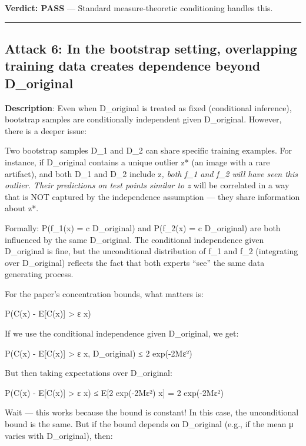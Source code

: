 \documentclass[
  12pt,
]{article}
\begin{document}
\textbf{Verdict: PASS} --- Standard measure-theoretic conditioning
handles this.

\begin{center}\rule{0.5\linewidth}{0.5pt}\end{center}

\subsection{Attack 6: In the bootstrap setting, overlapping training
data creates dependence beyond
D\_original}\label{attack-6-in-the-bootstrap-setting-overlapping-training-data-creates-dependence-beyond-d_original}

\textbf{Description}: Even when D\_original is treated as fixed
(conditional inference), bootstrap samples are conditionally independent
given D\_original. However, there is a deeper issue:

Two bootstrap samples D\_1 and D\_2 can share specific training
examples. For instance, if D\_original contains a unique outlier z* (an
image with a rare artifact), and both D\_1 and D\_2 include z\emph{,
both f\_1 and f\_2 will have seen this outlier. Their predictions on
test points similar to z} will be correlated in a way that is NOT
captured by the independence assumption --- they share information about
z*.

Formally: P(f\_1(x) = c \textbar{} D\_original) and P(f\_2(x) = c
\textbar{} D\_original) are both influenced by the same D\_original. The
conditional independence given D\_original is fine, but the
unconditional distribution of f\_1 and f\_2 (integrating over
D\_original) reflects the fact that both experts ``see'' the same data
generating process.

For the paper's concentration bounds, what matters is:

P(\textbar C(x) - E{[}C(x){]}\textbar{} \textgreater{} ε \textbar{} x)

If we use the conditional independence given D\_original, we get:

P(\textbar C(x) - E{[}C(x){]}\textbar{} \textgreater{} ε \textbar{} x,
D\_original) ≤ 2 exp(-2Mε²)

But then taking expectations over D\_original:

P(\textbar C(x) - E{[}C(x){]}\textbar{} \textgreater{} ε \textbar{} x) ≤
E{[}2 exp(-2Mε²) \textbar{} x{]} = 2 exp(-2Mε²)

Wait --- this works because the bound is constant! In this case, the
unconditional bound is the same. But if the bound depends on D\_original
(e.g., if the mean μ varies with D\_original), then:
\end{document}
